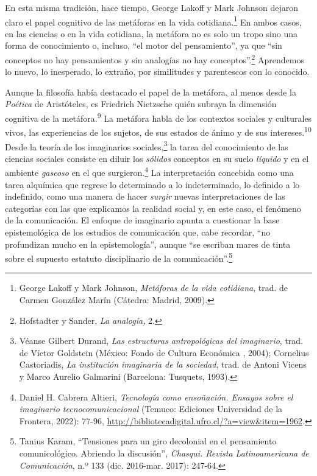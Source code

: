 \documentclass{tufte-handout}
\begin{document}
En esta misma tradición, hace tiempo, George Lakoff y Mark Johnson
dejaron claro el papel cognitivo de las metáforas en la vida
cotidiana.\footnote{George Lakoff y Mark Johnson, \emph{Metáforas de la
  vida cotidiana}, trad. de Carmen González Marín (Cátedra: Madrid,
  2009).} En ambos casos, en las ciencias o en la vida cotidiana, la
metáfora no es solo un tropo sino una forma de conocimiento o, incluso,
``el motor del pensamiento'', ya que ``sin conceptos no hay pensamientos
y sin analogías no hay conceptos''.\footnote{Hofstadter y Sander,
  \emph{La analogía,} 2.} Aprendemos lo nuevo, lo inesperado, lo
extraño, por similitudes y parentescos con lo conocido.

Aunque la filosofía había destacado el papel de la metáfora, al menos
desde la \emph{Poética} de Aristóteles, es Friedrich Nietzsche quién
subraya la dimensión cognitiva de la metáfora.\textsuperscript{9} La
metáfora habla de los contextos sociales y culturales vivos, las
experiencias de los sujetos, de sus estados de ánimo y de sus
intereses.\textsuperscript{10}
Desde la teoría de los imaginarios sociales,\footnote{Véanse Gilbert
  Durand, \emph{Las estructuras antropológicas del imaginario}, trad. de
  Víctor Goldstein (México: Fondo de Cultura Económica , 2004);
  Cornelius Castoriadis, \emph{La institución imaginaria de la
  sociedad}, trad. de Antoni Vicens y Marco Aurelio Galmarini
  (Barcelona: Tusquets, 1993).} la tarea del conocimiento de las
ciencias sociales consiste en diluir los \emph{sólidos} conceptos en su
suelo \emph{líquido} y en el ambiente \emph{gaseoso} en el que
surgieron.\footnote{Daniel H. Cabrera Altieri, \emph{Tecnología como
  ensoñación. Ensayos sobre el imaginario tecnocomunicacional} (Temuco:
  Ediciones Universidad de la Frontera, 2022): 77-96,
  \url{http://bibliotecadigital.ufro.cl/?a=view\&item=1962}.} La
interpretación concebida como una tarea alquímica que regrese lo
determinado a lo indeterminado, lo definido a lo indefinido, como una
manera de hacer \emph{surgir} nuevas interpretaciones de las categorías
con las que explicamos la realidad social y, en este caso, el fenómeno
de la comunicación. El enfoque de imaginario apunta a cuestionar la base
epistemológica de los estudios de comunicación que, cabe recordar, ``no
profundizan mucho en la epistemología'', aunque ``se escriban mares de
tinta sobre el supuesto estatuto disciplinario de la
comunicación''.\footnote{Tanius Karam, ``Tensiones para un giro
  decolonial en el pensamiento comunicológico. Abriendo la discusión'',
  \emph{Chasqui. Revista Latinoamericana de Comunicación}, n.º 133 (dic.
  2016-mar. 2017): 247-64.}
\end{document}
